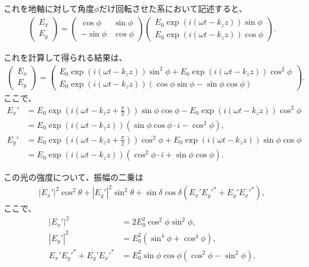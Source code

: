 \documentclass[a4paper,11pt]{jsarticle}
\numberwithin{equation}{section}
\begin{document}
これを地軸に対して角度\(\phi\)だけ回転させた系において記述すると、
\begin{align}
    \begin{pmatrix}
        E_x \\
        E_y
    \end{pmatrix} = 
    \begin{pmatrix}
        \cos \phi & \sin \phi \\
        -\sin \phi & \cos \phi
    \end{pmatrix}
    \begin{pmatrix}
        E_0 \exp(i(\omega t - k_z z)) \sin \phi \\
        E_0 \exp(i(\omega t - k_z z)) \cos \phi
    \end{pmatrix}.
\end{align}

これを計算して得られる結果は、
\begin{align}
    \begin{pmatrix}
        E_x \\
        E_y
    \end{pmatrix} = 
    \begin{pmatrix}
        E_0 \exp(i(\omega t - k_z z)) \sin^2 \phi + E_0 \exp(i(\omega t - k_z z)) \cos^2 \phi \\
        E_0 \exp(i(\omega t - k_z z)) (\cos \phi \sin \phi - \sin \phi \cos \phi)
    \end{pmatrix}.
\end{align}
ここで、
\begin{align}
    E_x' &= E_0 \exp\left(i\left(\omega t - k_z z + \frac{\pi}{2}\right)\right) \sin \phi \cos \phi - E_0 \exp\left(i(\omega t - k_z z)\right) \cos^2 \phi \\
    &= E_0 \exp(i(\omega t - k_z z)) \left(\sin \phi \cos \phi \cdot i - \cos^2 \phi\right), \\
    E_y' &= E_0 \exp\left(i\left(\omega t - k_z z + \frac{\pi}{2}\right)\right) \cos^2 \phi + E_0 \exp\left(i(\omega t - k_z z)\right) \sin \phi \cos \phi \\
    &= E_0 \exp(i(\omega t - k_z z)) \left(\cos^2 \phi \cdot i + \sin \phi \cos \phi\right).
\end{align}

この光の強度について、振幅の二乗は
\begin{align}
    |E_x'|^2 \cos^2 \theta + |E_y'|^2 \sin^2 \theta + \sin \delta \cos \delta (E_x' E_y'^* + E_y' E_x'^*),
\end{align}
ここで、
\begin{align}
    |E_x'|^2 &= 2 E_0^2 \cos^2 \phi \sin^2 \phi, \\
    |E_y'|^2 &= E_0^2 (\sin^4 \phi + \cos^4 \phi), \\
    E_x' E_y'^* + E_y' E_x'^* &= E_0^2 \sin \phi \cos \phi (\cos^2 \phi - \sin^2 \phi).
\end{align}
\end{document}

